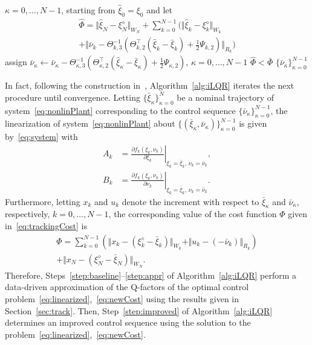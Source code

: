 \documentclass[10pt]{IEEEtran}      %
\theoremstyle{theorem}
\theoremstyle{remark}
\begin{document}
\begin{algorithm}[htb!]
\begin{algorithmic}[1]
\begin{equation*}
		\end{equation*}
		 $\kappa=0,\dots,N-1$, starting from $\hat{\xi}_0=\xi_0$ and let 
		\begin{multline*}
		\hat{\Phi}=\Vert \hat{\xi}_{N}-\xi_N^\diamond\Vert_{W_N}+\sum_{k=0}^{N-1}\bigg(\Vert \hat{\xi}_{k}-\xi_k^\diamond\Vert_{W_k}\\
		+\Vert \bar{\nu}_{k}-\Theta_{k,3}^{-1}(\Theta_{k,2}^\top (\hat{\xi}_{k}-\bar{\xi}_{k})+\tfrac{1}{2}\Psi_{k,2}) \Vert_{R_k}\bigg)
		\end{multline*}
	\IF{$\hat{\Phi}<\bar{\Phi}$}
		\STATE\label{step:assing} assign $\bar{\nu}_\kappa\leftarrow\bar{\nu}_{\kappa}-\Theta_{\kappa,3}^{-1}(\Theta_{\kappa,2}^\top (\hat{\xi}_{\kappa}-\bar{\xi}_{\kappa})+\tfrac{1}{2}\Psi_{\kappa,2})$, $\kappa=0,\dots,N-1$
	\ENDIF
\UNTIL $\hat{\Phi}<\bar{\Phi}$
\RETURN $\{\bar{\nu}_\kappa\}_{\kappa=0}^{N-1}$
\end{algorithmic}
\end{algorithm}

In fact, following the construction in~\cite{li2004iterative}, Algorithm~\ref{alg:iLQR}
iterates the next procedure until convergence. Letting $\{\bar{\xi}_\kappa\}_{\kappa=0}^{N}$ be a nominal trajectory
of system~\eqref{eq:nonlinPlant} corresponding to the control sequence $\{\bar{\nu}_\kappa\}_{\kappa=0}^{N-1}$, the linearization
of system~\eqref{eq:nonlinPlant} about $\{(\bar{\xi}_\kappa,\bar{\nu}_{\kappa})\}_{\kappa=0}^{N-1}$ is given by~\eqref{eq:system} with
\begin{subequations}
\begin{align}
A_k &=\left.\frac{\partial f_k(\xi_k,\nu_k)}{\partial \xi_k}\right|_{\xi_k=\bar{\xi}_k,\,\nu_k=\bar{\nu}_k},\\
B_k&=\left.\frac{\partial f_k(\xi_k,\nu_k)}{\partial \nu_k}\right|_{\xi_k=\bar{\xi}_k,\,\nu_k=\bar{\nu}_k}.
\end{align}
\label{eq:linearized}%
\end{subequations}
Furthermore, letting $x_k$ and $u_k$ denote the increment with respect to $\bar{\xi}_\kappa$ and $\bar{\nu}_{\kappa}$, respectively, 
$k=0,\dots,N-1$, the corresponding
value of the cost function $\Phi$ given in~\eqref{eq:trackingCost} is
\begin{multline}\label{eq:newCost}
\Phi = \sum_{k=0}^{N-1}\left(\Vert x_k-(\xi_k^\diamond-\bar{\xi}_{k})\Vert_{W_k}+\Vert u_k-(-\bar{\nu}_k) \Vert_{R_k}\right)\\
+\Vert x_N-(\xi_N^\diamond-\bar{\xi}_{N})\Vert_{W_N}.
\end{multline}
Therefore, Steps~\ref{step:baseline}--\ref{step:appr} of Algorithm~\ref{alg:iLQR} perform a data-driven approximation of the Q-factors
of the optimal control problem~\eqref{eq:linearized},~\eqref{eq:newCost} using the results given in Section~\ref{sec:track}. 
Then, Step~\ref{step:improved} of Algorithm~\ref{alg:iLQR} determines an improved control sequence using the solution to the problem~\eqref{eq:linearized},~\eqref{eq:newCost}.
\end{document}
